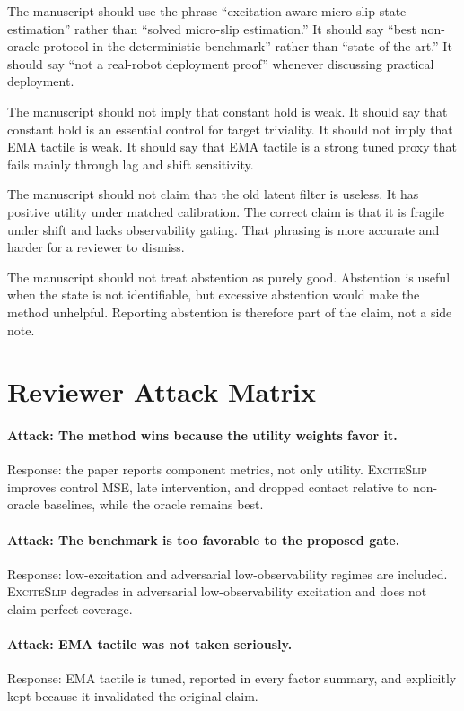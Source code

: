 \documentclass{article}
\newcommand{\method}{\textsc{ExciteSlip}\xspace}
\begin{document}
The manuscript should use the phrase ``excitation-aware micro-slip state estimation'' rather than ``solved micro-slip estimation.'' It should say ``best non-oracle protocol in the deterministic benchmark'' rather than ``state of the art.'' It should say ``not a real-robot deployment proof'' whenever discussing practical deployment.

The manuscript should not imply that constant hold is weak. It should say that constant hold is an essential control for target triviality. It should not imply that EMA tactile is weak. It should say that EMA tactile is a strong tuned proxy that fails mainly through lag and shift sensitivity.

The manuscript should not claim that the old latent filter is useless. It has positive utility under matched calibration. The correct claim is that it is fragile under shift and lacks observability gating. That phrasing is more accurate and harder for a reviewer to dismiss.

The manuscript should not treat abstention as purely good. Abstention is useful when the state is not identifiable, but excessive abstention would make the method unhelpful. Reporting abstention is therefore part of the claim, not a side note.

\section{Reviewer Attack Matrix}

\paragraph{Attack: The method wins because the utility weights favor it.}
Response: the paper reports component metrics, not only utility. \method improves control MSE, late intervention, and dropped contact relative to non-oracle baselines, while the oracle remains best.

\paragraph{Attack: The benchmark is too favorable to the proposed gate.}
Response: low-excitation and adversarial low-observability regimes are included. \method degrades in adversarial low-observability excitation and does not claim perfect coverage.

\paragraph{Attack: EMA tactile was not taken seriously.}
Response: EMA tactile is tuned, reported in every factor summary, and explicitly kept because it invalidated the original claim.
\end{document}
